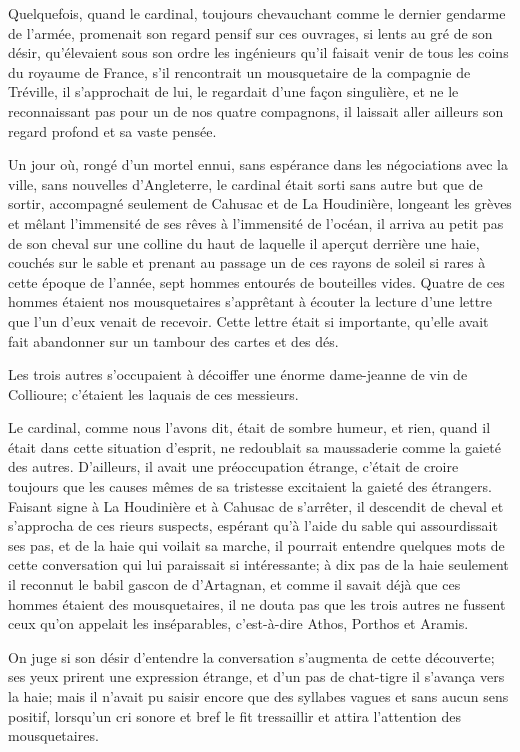 Quelquefois, quand le cardinal, toujours chevauchant comme le dernier gendarme de l'armée, promenait son regard pensif sur ces ouvrages, si lents au gré de son désir, qu'élevaient sous son ordre les ingénieurs qu'il faisait venir de tous les coins du royaume de France, s'il rencontrait un mousquetaire de la compagnie de Tréville, il s'approchait de lui, le regardait d'une façon singulière, et ne le reconnaissant pas pour un de nos quatre compagnons, il laissait aller ailleurs son regard profond et sa vaste pensée. 

Un jour où, rongé d'un mortel ennui, sans espérance dans les négociations avec la ville, sans nouvelles d'Angleterre, le cardinal était sorti sans autre but que de sortir, accompagné seulement de Cahusac et de La Houdinière, longeant les grèves et mêlant l'immensité de ses rêves à l'immensité de l'océan, il arriva au petit pas de son cheval sur une colline du haut de laquelle il aperçut derrière une haie, couchés sur le sable et prenant au passage un de ces rayons de soleil si rares à cette époque de l'année, sept hommes entourés de bouteilles vides. Quatre de ces hommes étaient nos mousquetaires s'apprêtant à écouter la lecture d'une lettre que l'un d'eux venait de recevoir. Cette lettre était si importante, qu'elle avait fait abandonner sur un tambour des cartes et des dés. 

Les trois autres s'occupaient à décoiffer une énorme dame-jeanne de vin de Collioure; c'étaient les laquais de ces messieurs. 

Le cardinal, comme nous l'avons dit, était de sombre humeur, et rien, quand il était dans cette situation d'esprit, ne redoublait sa maussaderie comme la gaieté des autres. D'ailleurs, il avait une préoccupation étrange, c'était de croire toujours que les causes mêmes de sa tristesse excitaient la gaieté des étrangers. Faisant signe à La Houdinière et à Cahusac de s'arrêter, il descendit de cheval et s'approcha de ces rieurs suspects, espérant qu'à l'aide du sable qui assourdissait ses pas, et de la haie qui voilait sa marche, il pourrait entendre quelques mots de cette conversation qui lui paraissait si intéressante; à dix pas de la haie seulement il reconnut le babil gascon de d'Artagnan, et comme il savait déjà que ces hommes étaient des mousquetaires, il ne douta pas que les trois autres ne fussent ceux qu'on appelait les inséparables, c'est-à-dire Athos, Porthos et Aramis. 

On juge si son désir d'entendre la conversation s'augmenta de cette découverte; ses yeux prirent une expression étrange, et d'un pas de chat-tigre il s'avança vers la haie; mais il n'avait pu saisir encore que des syllabes vagues et sans aucun sens positif, lorsqu'un cri sonore et bref le fit tressaillir et attira l'attention des mousquetaires. 

